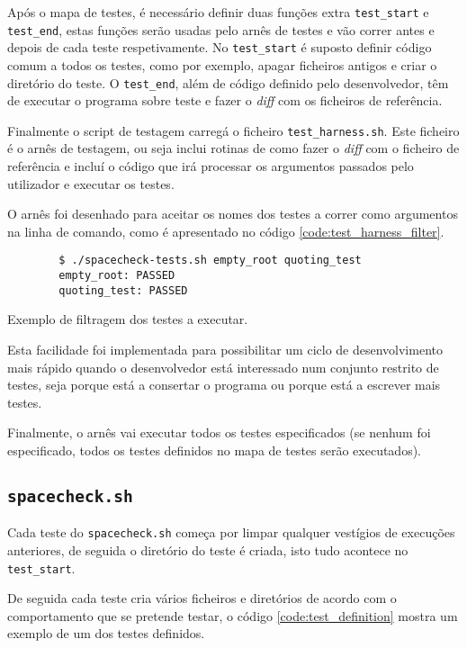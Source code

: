 Após o mapa de testes, é necessário definir duas funções extra \Verb|test_start|
e \Verb|test_end|, estas funções serão usadas pelo arnês de testes e vão correr
antes e depois de cada teste respetivamente. No \Verb|test_start| é suposto
definir código comum a todos os testes, como por exemplo, apagar ficheiros antigos
e criar o diretório do teste. O \Verb|test_end|, além de código definido pelo
desenvolvedor, têm de executar o programa sobre teste e fazer o \emph{diff} com
os ficheiros de referência.

Finalmente o script de testagem carregá o ficheiro \Verb|test_harness.sh|. Este
ficheiro é o arnês de testagem, ou seja inclui rotinas de como fazer o
\emph{diff} com o ficheiro de referência e incluí o código que irá processar
os argumentos passados pelo utilizador e executar os testes.

O arnês foi desenhado para aceitar os nomes dos testes a correr como argumentos
na linha de comando, como é apresentado no código \ref{code:test_harness_filter}.

\begin{listing}[H]
	\centering
	\begin{verbatim}
		$ ./spacecheck-tests.sh empty_root quoting_test
		empty_root: PASSED
		quoting_test: PASSED
	\end{verbatim}
	\cprotect\caption{Exemplo de filtragem dos testes a executar.}
	\label{code:test_harness_filter}
\end{listing}

Esta facilidade foi implementada para possibilitar um ciclo de desenvolvimento
mais rápido quando o desenvolvedor está interessado num conjunto restrito de
testes, seja porque está a consertar o programa ou porque está a escrever mais
testes.

Finalmente, o arnês vai executar todos os testes especificados (se nenhum foi
especificado, todos os testes definidos no mapa de testes serão executados).

\cprotect\subsection{\Verb|spacecheck.sh|}

Cada teste do \Verb|spacecheck.sh| começa por limpar
qualquer vestígios de execuções anteriores, de seguida o diretório do teste
é criada, isto tudo acontece no \Verb|test_start|.

De seguida cada teste cria vários ficheiros e diretórios de acordo com o
comportamento que se pretende testar, o código \ref{code:test_definition} mostra
um exemplo de um dos testes definidos.

